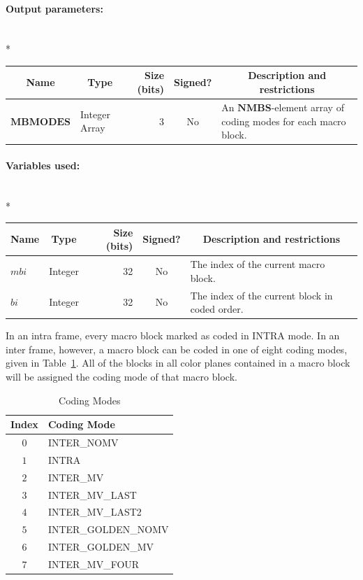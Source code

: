 \documentclass[11pt,letterpaper]{book}
\newcommand{\idx}[1]{{\ensuremath{\mathit{#1}}}}
\newcommand{\bi}{\idx{bi}}
\newcommand{\mbi}{\idx{mbi}}
\newcommand{\bitvar}[1]{\ensuremath{\mathbf{\bm #1}}}
\newcommand{\locvar}[1]{\ensuremath{\mathrm{#1}}}
\numberwithin{equation}{chapter}
\numberwithin{figure}{chapter}
\numberwithin{table}{chapter}
\begin{document}
\paragraph{Output parameters:}\hfill\\*
\begin{tabularx}{\textwidth}{@{}llrcX@{}}\toprule
\multicolumn{1}{c}{Name} &
\multicolumn{1}{c}{Type} &
\multicolumn{1}{p{30pt}}{\centering Size (bits)} &
\multicolumn{1}{c}{Signed?} &
\multicolumn{1}{c}{Description and restrictions} \\\midrule\endhead
\bitvar{MBMODES} & \multicolumn{1}{p{40pt}}{Integer Array} &
                              3 & No & An \bitvar{NMBS}-element array of coding
 modes for each macro block. \\
\bottomrule\end{tabularx}

\paragraph{Variables used:}\hfill\\*
\begin{tabularx}{\textwidth}{@{}llrcX@{}}\toprule
\multicolumn{1}{c}{Name} &
\multicolumn{1}{c}{Type} &
\multicolumn{1}{p{30pt}}{\centering Size (bits)} &
\multicolumn{1}{c}{Signed?} &
\multicolumn{1}{c}{Description and restrictions} \\\midrule\endhead
\locvar{\mbi}     & Integer & 32 & No & The index of the current macro
 block. \\
\locvar{\bi}      & Integer & 32 & No & The index of the current block in coded
 order. \\
\bottomrule\end{tabularx}
\medskip

In an intra frame, every macro block marked as coded in INTRA mode.
In an inter frame, however, a macro block can be coded in one of eight coding
 modes, given in Table~\ref{tab:coding-modes}.
All of the blocks in all color planes contained in a macro block will be
 assigned the coding mode of that macro block.

\begin{table}[htb]
\begin{center}
\begin{tabular}{cl}\toprule
Index & Coding Mode \\\midrule
$0$   & INTER\_NOMV         \\
$1$   & INTRA               \\
$2$   & INTER\_MV           \\
$3$   & INTER\_MV\_LAST     \\
$4$   & INTER\_MV\_LAST2    \\
$5$   & INTER\_GOLDEN\_NOMV \\
$6$   & INTER\_GOLDEN\_MV   \\
$7$   & INTER\_MV\_FOUR     \\
\bottomrule\end{tabular}
\end{center}
\caption{Coding Modes}
\label{tab:coding-modes}
\end{table}
\end{document}
